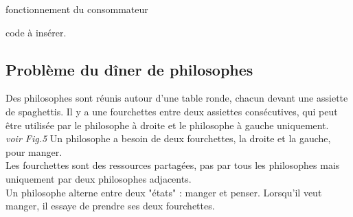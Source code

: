 \begin{adjustwidth}{-3cm}{-3cm}
\begin{implementation}{fonctionnement du consommateur}
\begin{lstLNat}
    \end{lstLNat}
\end{implementation}

code à insérer.

\subsection{Problème du dîner de philosophes}

Des philosophes sont réunis autour d'une table ronde, chacun devant une assiette de spaghettis. Il y a une fourchettes entre deux assiettes consécutives, qui peut être utilisée par le philosophe à droite et le philosophe à gauche uniquement.\\ \textit{voir Fig.5}
Un philosophe a besoin de deux fourchettes, la droite et la gauche, pour manger.\\
Les fourchettes sont des ressources partagées, pas par tous les philosophes mais uniquement par deux philosophes adjacents.\\
Un philosophe alterne entre deux "états" : manger et penser. Lorsqu'il veut manger, il essaye de prendre ses deux fourchettes.\\ \\


\end{adjustwidth}
